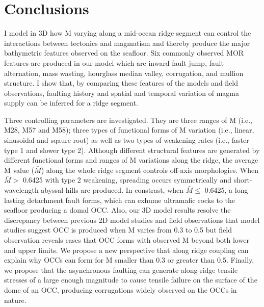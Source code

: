 \pagebreak
\section{Conclusions}
I model in 3D how M varying along a mid-ocean ridge segment can control the interactions between tectonics and magmatism and thereby produce the major bathymetric features observed on the seafloor.
Six commonly observed MOR features are produced in our model which are inward fault jump, fault alternation, mass wasting, hourglass median valley, corrugation, and mullion structure. I show that, by comparing these features of the models and field observations, faulting history and spatial and temporal variation of magma supply can be inferred for a ridge segment.

Three controlling parameters are investigated. They are three ranges of M (i.e., M28, M57 and M58); three types of functional forms of M variation (i.e., linear, sinusoidal and sqaure root) as well as two types of weakening rates (i.e., faster type 1 and slower type 2). Although different structural features are generated by different functional forms and ranges of M variations along the ridge, the average M value ($\bar{M}$) along the whole ridge segment controls off-axis morphologies. When $\bar{M} >$ 0.6425 with type 2 weakening, spreading occurs symmetrically and short-wavelength abyssal hills are produced. In constrast, when $\bar{M} \le$ 0.6425, a long lasting detachment fault forms, which can exhume ultramafic rocks to the seafloor producing a domal OCC. Also, our 3D model results resolve the discrepancy between previous 2D model studies and field observations that model studies suggest OCC is produced when M varies from 0.3 to 0.5 but field observation reveals cases that OCC forms with observed M beyond both lower and upper limits. We propose a new perspective that along ridge coupling can explain why OCCs can form for M smaller than 0.3 or greater than 0.5. Finally, we propose that the asynchronous faulting can generate along-ridge tensile stresses of a large enough magnitude to cause tensile failure on the surface of the dome of an OCC, producing corrugations widely observed on the OCCs in nature.




